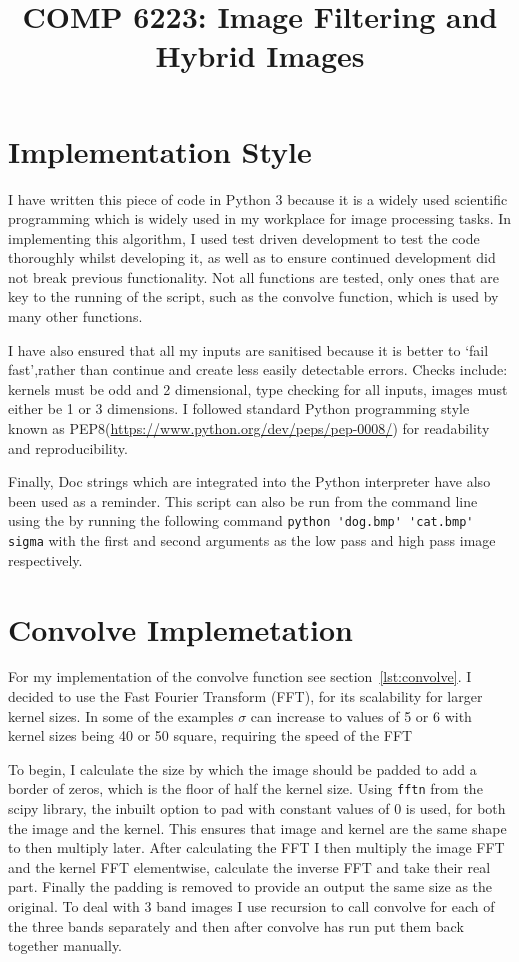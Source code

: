 \documentclass[a4paper,10pt]{article}
\title{COMP 6223: Image Filtering and Hybrid Images}
\date{}
\author{}
\begin{document}
\maketitle
\thispagestyle{fancy}

\section{Implementation Style}
I have written this piece of code in Python 3 because it is a widely used
scientific programming which is widely used in my workplace for image processing
tasks. In implementing this algorithm, I used test driven development to test the code
thoroughly whilst developing it, as well as to ensure continued development did
not break previous functionality. Not all functions are tested, only ones that
are key to the running of the script, such as the convolve function, which is
used by many other functions.

I have also ensured that all my inputs are sanitised because it is better to
`fail fast',rather than continue and create less easily detectable errors.
Checks include: kernels must be odd and 2 dimensional, type checking for all
inputs, images must either be 1 or 3 dimensions. I followed standard Python
programming style known as PEP8(\url{https://www.python.org/dev/peps/pep-0008/})
for readability and reproducibility.

Finally, Doc strings which are
integrated into the Python interpreter have also been used as a reminder. This
script can also be run from the command line using the by running the following
command \lstinline|python 'dog.bmp' 'cat.bmp' sigma| with the first and second
arguments as the low pass  and high pass image respectively.

\section{Convolve Implemetation}
For my implementation of the convolve function see section~\ref{lst:convolve}. I
decided to use the Fast Fourier Transform (FFT), for its scalability
for larger kernel sizes. In some of the examples $\sigma$ can increase to values
of 5 or 6 with kernel sizes being 40 or 50 square, requiring the speed of the
FFT

To begin, I calculate the size by which the image should be padded to add a
border of zeros, which is the floor of half the kernel size. Using
\lstinline|fftn| from the scipy library, the inbuilt option to pad with constant
values of 0 is used, for both the image and the kernel. This ensures that
image and kernel are the same shape to then multiply later. After
calculating the FFT I then multiply the image FFT and the kernel FFT
elementwise, calculate the inverse FFT and take their real part. Finally the
padding is removed to provide an output the same size as the original. To deal with 3 band
images I use recursion to call convolve for each of the three bands separately
and then after convolve has run put them back together manually.
\end{document}
